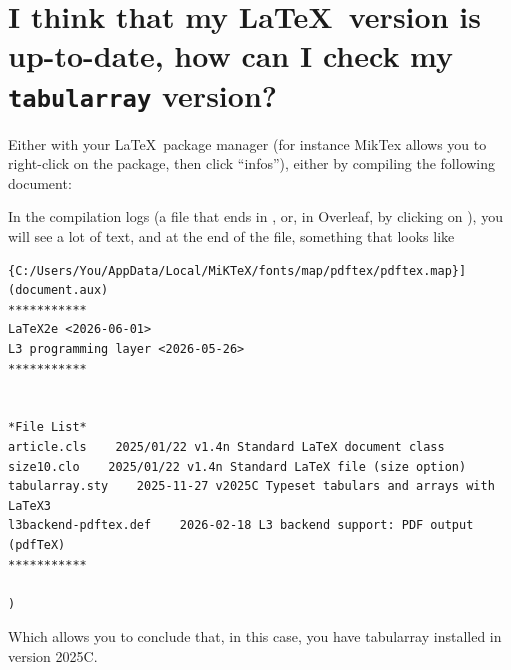 \section{I think that my \LaTeX\ version is up-to-date, how can I check my \texttt{tabularray} version?}

Either with your \LaTeX\ package manager (for instance MikTex allows you to right-click on the package, then click ``infos''), either by compiling the following document:


In the compilation logs (a file that ends in , or, in Overleaf, by clicking on ), you will see a lot of text, and at the end of the file, something that looks like 

\begin{verbatim}
{C:/Users/You/AppData/Local/MiKTeX/fonts/map/pdftex/pdftex.map}] (document.aux)
***********
LaTeX2e <2026-06-01>
L3 programming layer <2026-05-26>
***********


*File List*
article.cls    2025/01/22 v1.4n Standard LaTeX document class
size10.clo    2025/01/22 v1.4n Standard LaTeX file (size option)
tabularray.sty    2025-11-27 v2025C Typeset tabulars and arrays with LaTeX3
l3backend-pdftex.def    2026-02-18 L3 backend support: PDF output (pdfTeX)
***********

)
\end{verbatim}

Which allows you to conclude that, in this case, you have tabularray installed in version 2025C.
